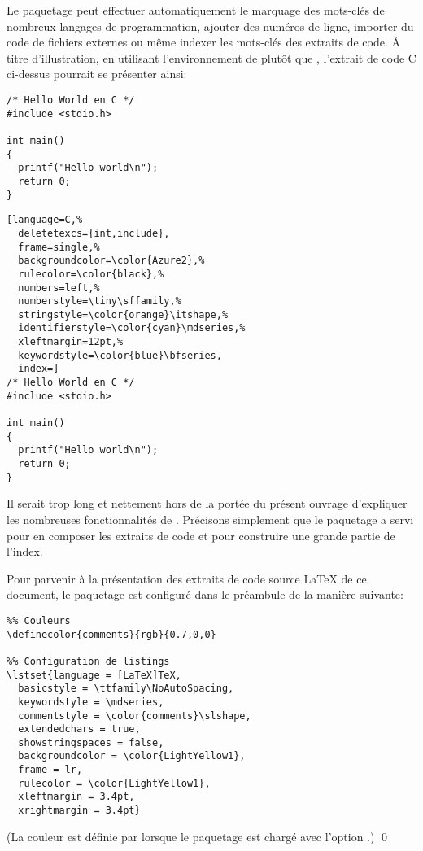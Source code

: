 Le paquetage  peut effectuer automatiquement le marquage
des mots-clés de nombreux langages de programmation, ajouter des
numéros de ligne, importer du code de fichiers externes ou même
indexer les mots-clés des extraits de code. À titre d'illustration, en
utilisant l'environnement  de  plutôt que
, l'extrait de code C ci-dessus pourrait se présenter
ainsi:
\begin{demo}
  \begin{texample}
    \begin{vglisting}
\begin{lstlisting}
/* Hello World en C */
#include <stdio.h>

int main()
{
  printf("Hello world\n");
  return 0;
}
\end{lstlisting}
    \end{vglisting}
    \producing
\begin{lstlisting}[language=C,%
  deletetexcs={int,include},
  frame=single,%
  backgroundcolor=\color{Azure2},%
  rulecolor=\color{black},%
  numbers=left,%
  numberstyle=\tiny\sffamily,%
  stringstyle=\color{orange}\itshape,%
  identifierstyle=\color{cyan}\mdseries,%
  xleftmargin=12pt,%
  keywordstyle=\color{blue}\bfseries,
  index=]
/* Hello World en C */
#include <stdio.h>

int main()
{
  printf("Hello world\n");
  return 0;
}
\end{lstlisting}
  \end{texample}
\end{demo}

Il serait trop long et nettement hors de la portée du présent ouvrage
d'expliquer les nombreuses fonctionnalités de .
Précisons simplement que le paquetage a servi pour en composer les
extraits de code et pour construire une grande partie de
l'index.

\begin{exemple}
  \label{ex:trucs:listings}
  Pour parvenir à la présentation des extraits de code source {\LaTeX}
  de ce document, le paquetage  est configuré dans le
  préambule de la manière suivante:
\begin{lstlisting}
%% Couleurs
\definecolor{comments}{rgb}{0.7,0,0}

%% Configuration de listings
\lstset{language = [LaTeX]TeX,
  basicstyle = \ttfamily\NoAutoSpacing,
  keywordstyle = \mdseries,
  commentstyle = \color{comments}\slshape,
  extendedchars = true,
  showstringspaces = false,
  backgroundcolor = \color{LightYellow1},
  frame = lr,
  rulecolor = \color{LightYellow1},
  xleftmargin = 3.4pt,
  xrightmargin = 3.4pt}
\end{lstlisting}
  (La couleur  est définie par  lorsque
  le paquetage est chargé avec l'option .)
  \qed
\end{exemple}



